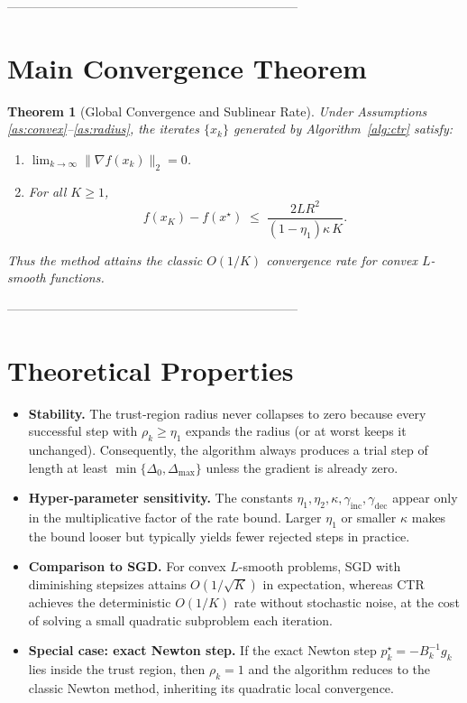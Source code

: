 \documentclass{article}
\newtheorem{theorem}{Theorem}
\begin{document}
---------------------------------------------------------------------

\section*{Main Convergence Theorem}
\begin{theorem}[Global Convergence and Sublinear Rate]\label{thm:main}
Under Assumptions \ref{as:convex}–\ref{as:radius}, the iterates \(\{x_k\}\) generated by
Algorithm~\ref{alg:ctr} satisfy:
\begin{enumerate}
  \item \(\displaystyle \lim_{k\to\infty}\|\nabla f(x_k)\|_2 = 0\).
  \item For all \(K\ge 1\),
  \[
    f(x_K)-f(x^{\star})\;\le\;
    \frac{2L R^2}{(1-\eta_1)\kappa\,K}.
  \tag{Rate}
  \]
\end{enumerate}
Thus the method attains the classic \(O(1/K)\) convergence rate for convex
\(L\)-smooth functions.
\end{theorem}

---------------------------------------------------------------------

\section*{Theoretical Properties}
\begin{itemize}
  \item \textbf{Stability.}  The trust‑region radius never collapses to zero
        because every successful step with \(\rho_k\ge\eta_1\) expands the radius
        (or at worst keeps it unchanged).  Consequently, the algorithm always
        produces a trial step of length at least \(\min\{\Delta_0,\Delta_{\max}\}\)
        unless the gradient is already zero.
  \item \textbf{Hyper‑parameter sensitivity.}
        The constants \(\eta_1,\eta_2,\kappa,\gamma_{\text{inc}},\gamma_{\text{dec}}\)
        appear only in the multiplicative factor of the rate bound.
        Larger \(\eta_1\) or smaller \(\kappa\) makes the bound looser but
        typically yields fewer rejected steps in practice.
  \item \textbf{Comparison to SGD.}
        For convex \(L\)-smooth problems, SGD with diminishing stepsizes attains
        \(O(1/\sqrt{K})\) in expectation, whereas CTR achieves the deterministic
        \(O(1/K)\) rate without stochastic noise, at the cost of solving a
        small quadratic subproblem each iteration.
  \item \textbf{Special case: exact Newton step.}
        If the exact Newton step \(p_k^{\star}= -B_k^{-1}g_k\) lies inside the
        trust region, then \(\rho_k=1\) and the algorithm reduces to the
        classic Newton method, inheriting its quadratic local convergence.
\end{itemize}
\end{document}
